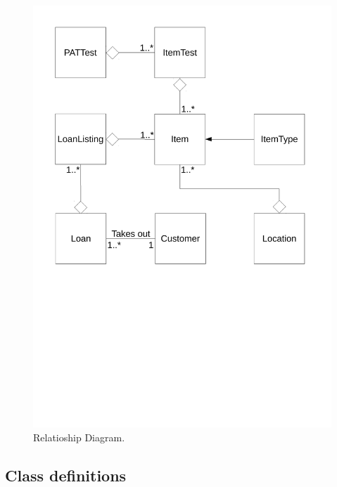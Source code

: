\begin{figure}[H]
    \includegraphics[width=\textwidth]{./Analysis/Relationship_Diagrams/Relationships_diagrams.pdf}
    \caption{Relatioship Diagram.} \label{fig:relationship_diagram}
\end{figure}

\subsection{Class definitions}


